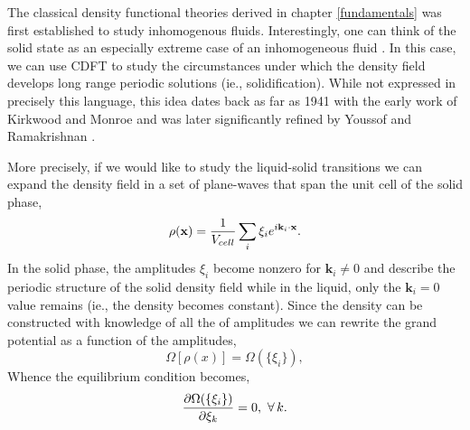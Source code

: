 The classical density functional theories derived in chapter \ref{fundamentals} was first established to study inhomogenous fluids.
Interestingly, one can think of the solid state as an especially extreme case of an inhomogeneous fluid \cite{HANSEN-CH6}.
In this case, we can use CDFT to study the circumstances under which the density field develops long range periodic solutions (ie., solidification).
While not expressed in precisely this language, this idea dates back as far as 1941 with the early work of Kirkwood and Monroe \cite{KIRKWOOD_MONROE41} and was later significantly refined by Youssof and Ramakrishnan \cite{RAMAKRISHNAN79}.

More precisely, if we would like to study the liquid-solid transitions we can expand the density field in a set of plane-waves that span the unit cell of the solid phase,
%
\begin{equation}
    \rho(\mathbf{x}) = \frac{1}{V_{cell}} \sum_i \xi_i e^{i \mathbf{k}_i \cdot \mathbf{x}}.
\end{equation}
%
In the solid phase, the amplitudes $\xi_i$ become nonzero for $\mathbf{k}_i \ne 0$ and describe the periodic structure of the solid density field while in the liquid, only the $\mathbf{k}_i = 0$ value remains (ie., the density becomes constant).
Since the density can be constructed with knowledge of all the of amplitudes we can rewrite the grand potential as a function of the amplitudes, 
%
\begin{equation}
    \Omega[\rho(x)] = \Omega(\lbrace\xi_i\rbrace),
\end{equation}
%
Whence the equilibrium condition becomes,
%
\begin{equation}
    \frac{\partial \Omega(\lbrace\xi_i\rbrace)}{\partial \xi_k} = 0, \,\,\forall \,k.
\end{equation}
